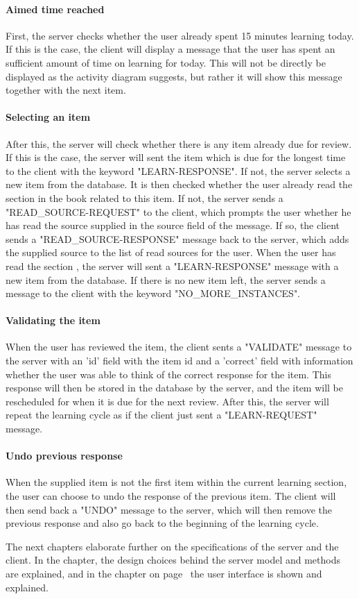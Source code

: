 \paragraph{Aimed time reached} First, the server checks whether the user already spent 15 minutes learning today. If this is the case, the client will display a message that the user has spent an sufficient amount of time on learning for today. This will not be directly be displayed as the activity diagram suggests, but rather it will show this message together with the next item.

\paragraph{Selecting an item} After this, the server will check whether there is any item already due for review. If this is the case, the server will sent the item which is due for the longest time to the client with the keyword "LEARN-RESPONSE". If not, the server selects a new item from the database. It is then checked whether the user already read the section in the book related to this item. If not, the server sends a "READ\_SOURCE-REQUEST" to the client, which prompts the user whether he has read the source supplied in the source field of the message. If so, the client sends a "READ\_SOURCE-RESPONSE" message back to the server, which adds the supplied source to the list of read sources for the user. When the user has read the section , the server will sent a "LEARN-RESPONSE" message with a new item from the database. If there is no new item left, the server sends a message to the client with the keyword "NO\_MORE\_INSTANCES".


\paragraph{Validating the item} When the user has reviewed the item, the client sents a "VALIDATE" message to the server with an 'id' field with the item id and a 'correct' field with information whether the user was able to think of the correct response for the item. This response will then be stored in the database by the server, and the item will be rescheduled for when it is due for the next review. After this, the server will repeat the learning cycle as if the client just sent a "LEARN-REQUEST" message.

\paragraph{Undo previous response} When the supplied item is not the first item within the current learning section, the user can choose to undo the response of the previous item. The client will then send back a "UNDO" message to the server, which will then remove the previous response and also go back to the beginning of the learning cycle.

The next chapters elaborate further on the specifications of the server and the client. In the  chapter, the design choices behind the server model and methods are explained, and in the  chapter on page~\pageref{ch:client} the user interface is shown and explained.
